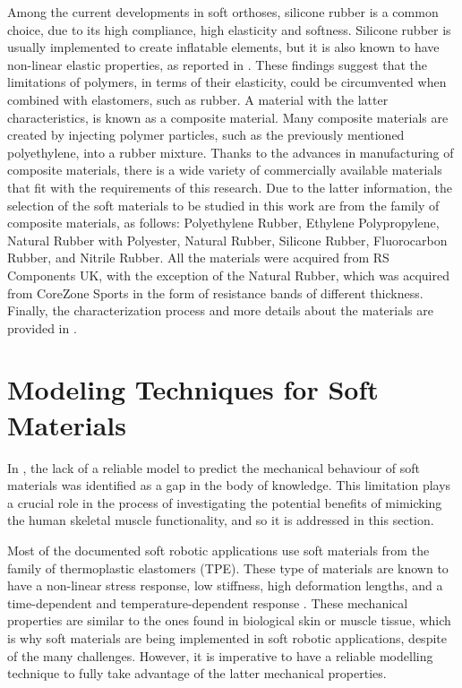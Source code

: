 Among the current developments in soft orthoses, silicone rubber is a common choice, due to its high compliance, high elasticity and softness. Silicone rubber is usually implemented to create inflatable elements, but it is also known to have non-linear elastic properties, as reported in \cite{roylance2008mechanical}. These findings suggest that the limitations of polymers, in terms of their elasticity, could be circumvented when combined with elastomers, such as rubber. A material with the latter characteristics, is known as a composite material. Many composite materials are created by injecting polymer particles, such as the previously mentioned polyethylene, into a rubber mixture. Thanks to the advances in manufacturing of composite materials, there is a wide variety of commercially available materials that fit with the requirements of this research. Due to the latter information, the selection of the soft materials to be studied in this work are from the family of composite materials, as follows: Polyethylene Rubber, Ethylene Polypropylene, Natural Rubber with Polyester, Natural Rubber, Silicone Rubber, Fluorocarbon Rubber, and Nitrile Rubber. All the materials were acquired from RS Components UK\textregistered{}, with the exception of the Natural Rubber, which was acquired from CoreZone Sports\textregistered{} in the form of resistance bands of different thickness. Finally, the characterization process and more details about the materials are provided in .

\newpage

\section{Modeling Techniques for Soft Materials} \label{sec:modelingTechniques}

In , the lack of a reliable model to predict the mechanical behaviour of soft materials was identified as a gap in the body of knowledge. This limitation plays a crucial role in the process of investigating the potential benefits of mimicking the human skeletal muscle functionality, and so it is addressed in this section. 

Most of the documented soft robotic applications use soft materials from the family of thermoplastic elastomers (TPE). These type of materials are known to have a non-linear stress response, low stiffness, high deformation lengths, and a time-dependent and temperature-dependent response \cite{Bauman2008}. These mechanical properties are similar to the ones found in biological skin or muscle tissue, which is why soft materials are being implemented in soft robotic applications, despite of the many challenges. However, it is imperative to have a reliable modelling technique to fully take advantage of the latter mechanical properties.

